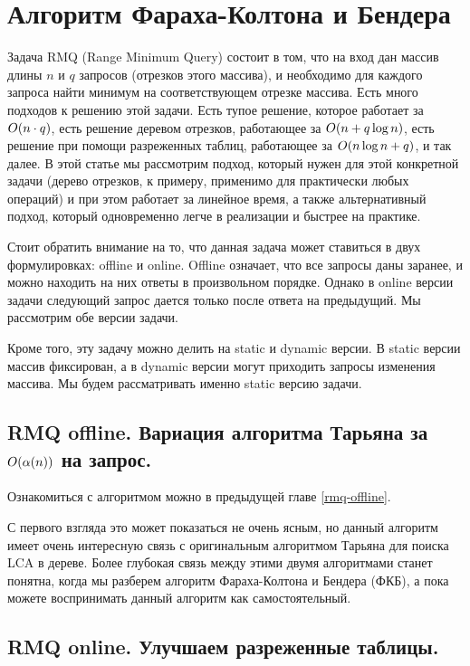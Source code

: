 \chapter{Алгоритм Фараха-Колтона и Бендера}

Задача RMQ (Range Minimum Query) состоит в том, что на вход дан массив длины $n$ и $q$ запросов (отрезков этого массива), и необходимо для каждого запроса найти минимум на соответствующем отрезке массива. Есть много подходов к решению этой задачи. Есть тупое решение, которое работает за $O(n \cdot q)$, есть решение деревом отрезков, работающее за $O(n + q \log n)$, есть решение при помощи разреженных таблиц, работающее за $O(n \log n + q)$, и так далее. В этой статье мы рассмотрим подход, который нужен для этой конкретной задачи (дерево отрезков, к примеру, применимо для практически любых операций) и при этом работает за линейное время, а также альтернативный подход, который одновременно легче в реализации и быстрее на практике.

Стоит обратить внимание на то, что данная задача может ставиться в двух формулировках: offline и online. Offline означает, что все запросы даны заранее, и можно находить на них ответы в произвольном порядке. Однако в online версии задачи следующий запрос дается только после ответа на предыдущий. Мы рассмотрим обе версии задачи.

Кроме того, эту задачу можно делить на static и dynamic версии. В static версии массив фиксирован, а в dynamic версии могут приходить запросы изменения массива. Мы будем рассматривать именно static версию задачи.

\section{RMQ offline. Вариация алгоритма Тарьяна за $O(\alpha(n))$ на запрос.}

Ознакомиться с алгоритмом можно в предыдущей главе \ref{rmq-offline}.

С первого взгляда это может показаться не очень ясным, но данный алгоритм имеет очень интересную связь с оригинальным алгоритмом Тарьяна для поиска LCA в дереве. Более глубокая связь между этими двумя алгоритмами станет понятна, когда мы разберем алгоритм Фараха-Колтона и Бендера (ФКБ), а пока можете воспринимать данный алгоритм как самостоятельный.


\section{RMQ online. Улучшаем разреженные таблицы.}

